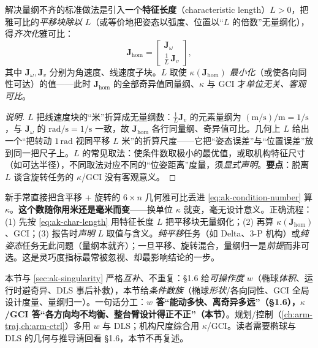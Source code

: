 \begin{theorem}[特征长度归一化]\label{thm:ak-char-length}
解决量纲不齐的标准做法是引入一个\textbf{特征长度}（characteristic length）$L>0$，把雅可比的\emph{平移块除以} $L$（或等价地把姿态以弧度、位置以“$L$ 的倍数”无量纲化），得\emph{齐次化}雅可比\cite{angeles2014fundamentals}：
\begin{equation}
  \mathbf{J}_{\mathrm{hom}}=\begin{bmatrix}\mathbf{J}_\omega\\[2pt] \tfrac{1}{L}\,\mathbf{J}_v\end{bmatrix},
  \label{eq:ak-char-length}
\end{equation}
其中 $\mathbf{J}_\omega,\mathbf{J}_v$ 分别为角速度、线速度子块。$L$ 取使 $\kappa(\mathbf{J}_{\mathrm{hom}})$ \emph{最小化}（或使各向同性可达）的值——此时 $\mathbf{J}_{\mathrm{hom}}$ 的全部奇异值同量纲、$\kappa$ 与 GCI 才\emph{单位无关、客观可比}。
\end{theorem}
\begin{proof}[说明]
$L$ 把线速度块的“米”折算成无量纲数：$\frac{1}{L}\mathbf{J}_v$ 的元素量纲为 $\mathrm{(m/s)/m}=\mathrm{1/s}$，与 $\mathbf{J}_\omega$ 的 $\mathrm{rad/s}=\mathrm{1/s}$ 一致，故 $\mathbf{J}_{\mathrm{hom}}$ 各行同量纲、奇异值可比。几何上 $L$ 给出一个“把转动 $1\,\mathrm{rad}$ 视同平移 $L$ 米”的折算尺度——它把“姿态误差”与“位置误差”放到同一把尺子上。$L$ 的常见取法：使条件数取极小的最优值，或取机构特征尺寸（如可达半径），不同取法对应不同的“位姿距离”度量，须\emph{显式声明}。\textbf{要点}：脱离 $L$ 谈含旋转任务的 $\kappa$/GCI 没有客观意义。
\end{proof}

\begin{pitfall}
新手常直接把含平移 + 旋转的 $6\times n$ 几何雅可比丢进 \cref{eq:ak-condition-number} 算 $\kappa$。\textbf{这个数随你用米还是毫米而变}——换单位 $\kappa$ 就变，毫无设计意义。正确流程：(1) 先按 \cref{eq:ak-char-length} 用特征长度 $L$ 把平移块无量纲化；(2) 再算 $\kappa(\mathbf{J}_{\mathrm{hom}})$、GCI；(3) 报告时\emph{声明} $L$ 取值与含义。\emph{纯平移}任务（如 Delta、3\nobreakdash-P 机构）或\emph{纯姿态}任务无此问题（量纲本就齐）；一旦平移、旋转混合，量纲归一是\emph{前提}而非可选。这是灵巧度指标最常被忽视、却最影响结论的一步。
\end{pitfall}

\begin{note}\label{note:ak-design-complement}
本节与 \cref{sec:ak-singularity} 严格\emph{互补}、不重复：§1.6 给\emph{可操作度} $w$（椭球\emph{体积}、运行时避奇异、DLS 事后补救），本节给\emph{条件数族}（椭球\emph{形状}/各向同性、GCI 全局设计度量、量纲归一）。一句话分工：\textbf{$w$ 答“能动多快、离奇异多远”（§1.6），$\kappa$/GCI 答“各方向均不均衡、整台臂设计得正不正”（本节）}。规划/控制（\cref{ch:arm-traj,ch:arm-ctrl}）多用 $w$ 与 DLS；机构尺度综合用 $\kappa$/GCI。读者需要椭球与 DLS 的几何与推导请回看 §1.6，本节不再复述。
\end{note}


